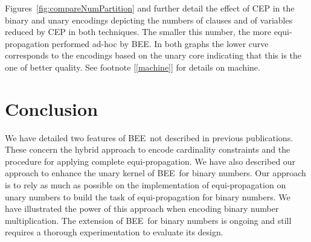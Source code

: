 \documentclass[runningheads,a4paper]{llncs}
\newcommand{\bee}{\textsf{BEE}}
\begin{document}
Figures~\ref{fig:compareNumPartition} and 
further detail the effect of CEP in the binary and unary encodings
depicting the numbers of clauses and of variables reduced by CEP in
both techniques. The smaller this number, the more equi-propagation
performed ad-hoc by \bee.
In both graphs the lower curve corresponds to the encodings based on
the unary core indicating that this is the one of better quality. See
footnote [\ref{machine}] for details on machine.





\section{Conclusion}

We have detailed two features of \bee\ not described in previous
publications. These concern the hybrid approach to encode cardinality
constraints and the procedure for applying complete
equi-propagation. We have also described our approach to enhance the
unary kernel of \bee\ for binary numbers. Our approach is to rely as
much as possible on the implementation of equi-propagation on unary
numbers to build the task of equi-propagation for binary numbers. We
have illustrated the power of this approach when encoding binary
number multiplication. The extension of \bee\ for binary numbers is
ongoing and still requires a thorough experimentation to evaluate its
design.

\newpage
\end{document}
